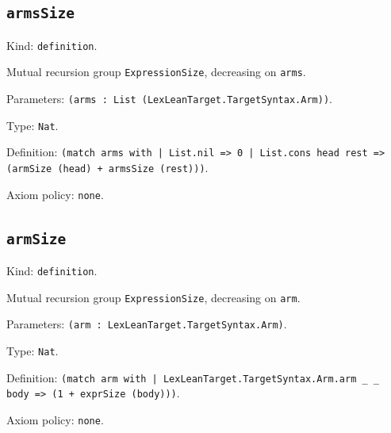 \documentclass[11pt]{article}
\begin{document}
\subsection*{\texttt{armsSize}}
\noindent Kind: \texttt{definition}.\par
\noindent Mutual recursion group \texttt{ExpressionSize}, decreasing on \texttt{arms}.\par
\noindent Parameters: \texttt{(arms : List (LexLeanTarget.TargetSyntax.Arm))}.\par
\noindent Type: \texttt{Nat}.\par
\noindent Definition: \texttt{(match arms with | List.nil => 0 | List.cons head rest => (armSize (head) + armsSize (rest)))}.\par
\noindent Axiom policy: \texttt{none}.\par
\subsection*{\texttt{armSize}}
\noindent Kind: \texttt{definition}.\par
\noindent Mutual recursion group \texttt{ExpressionSize}, decreasing on \texttt{arm}.\par
\noindent Parameters: \texttt{(arm : LexLeanTarget.TargetSyntax.Arm)}.\par
\noindent Type: \texttt{Nat}.\par
\noindent Definition: \texttt{(match arm with | LexLeanTarget.TargetSyntax.Arm.arm \_ \_ body => (1 + exprSize (body)))}.\par
\noindent Axiom policy: \texttt{none}.\par
\end{document}
